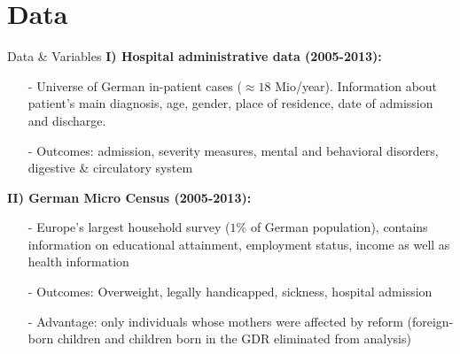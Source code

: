 \documentclass[handout]{beamer} %
\begin{document}
\section{Data}
\begin{frame}{Data \& Variables}
\textbf{I) Hospital administrative data (2005-2013):} 
\begin{itemize}
\item[-] Universe of German in-patient cases ($\approx 18$ Mio/year). \newline Information about patient's main diagnosis, age, gender, place of residence, date of admission and discharge.
\item[-] Outcomes: admission, severity measures, mental and behavioral disorders, digestive \& circulatory system
\end{itemize}


\pause
 \textbf{II) German Micro Census (2005-2013):}
\begin{itemize}
\item[-] Europe's largest household survey ($1\%$ of German population), contains information on educational attainment, employment status, income as well as health information
\item[-] Outcomes: Overweight, legally handicapped, sickness, hospital admission

\item[-]Advantage: only individuals whose mothers were affected by reform (foreign-born children and children born in the GDR eliminated from analysis)

\end{itemize} 
 

\end{frame}
\end{document}
